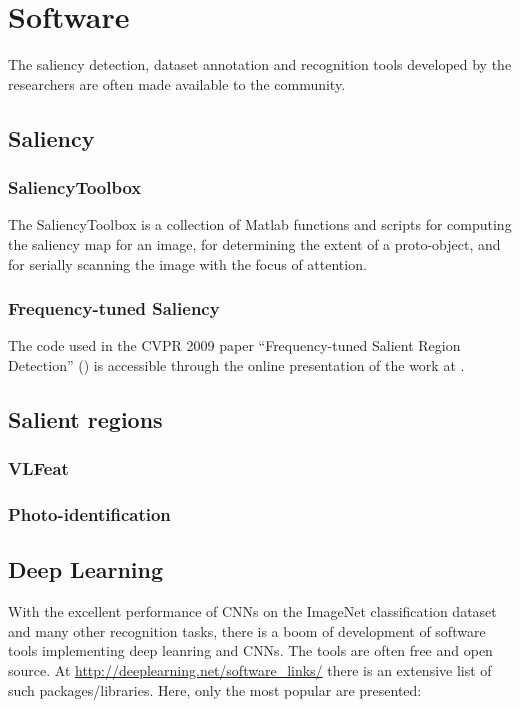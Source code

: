 \section{Software}
\label{sec:soft}

The saliency detection, dataset annotation and recognition tools developed by the researchers are often made available to the community.

\subsection{Saliency}
\subsubsection{SaliencyToolbox}\label{subsec:saltool}
The SaliencyToolbox is a collection of Matlab functions and scripts for computing the saliency map for an image, for determining the extent of a proto-object, and for serially scanning the image with the focus of attention. 

\subsubsection{Frequency-tuned Saliency}
The code used in the CVPR 2009 paper ``Frequency-tuned Salient Region Detection'' (\cite{LCAV-CONF-2009-012}) is accessible through the online presentation of the work at \cite{achantaCVPR09}.


\subsection{Salient regions}
\subsubsection{VLFeat}\label{vlfeat:sec}
\subsubsection{Photo-identification}


\subsection{Deep Learning}
With the excellent performance of CNNs on the ImageNet classification dataset and many other recognition tasks, there is a boom of development of software tools implementing deep leanring and CNNs. 
The tools are often free and open source. At \url{http://deeplearning.net/software_links/} there is an extensive list of such packages/libraries. Here, only the most popular are presented:
